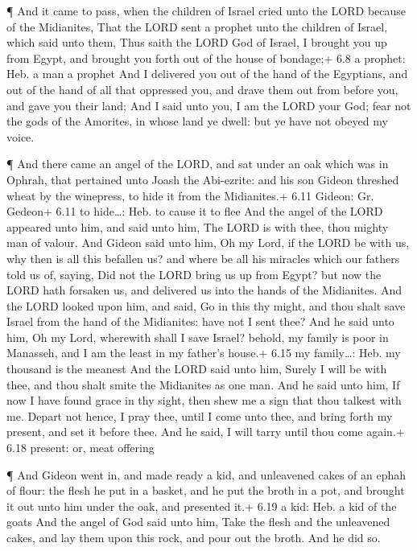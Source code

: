  ¶ And it came to pass, when the children of Israel cried
unto the LORD because of the Midianites,  That the LORD sent
a prophet unto the children of Israel, which said unto them, Thus saith
the LORD God of Israel, I brought you up from Egypt, and brought you
forth out of the house of bondage;+ 6.8 a prophet: Heb. a man a prophet
 And I delivered you out of the hand of the Egyptians, and
out of the hand of all that oppressed you, and drave them out from
before you, and gave you their land;  And I said unto you,
I am the LORD your God; fear not the gods of the Amorites, in whose land
ye dwell: but ye have not obeyed my voice.

 ¶ And there came an angel of the LORD, and sat under an
oak which was in Ophrah, that pertained unto Joash the Abi-ezrite: and
his son Gideon threshed wheat by the winepress, to hide it from the
Midianites.+ 6.11 Gideon: Gr. Gedeon+ 6.11 to hide\ldots: Heb. to cause
it to flee  And the angel of the LORD appeared unto him,
and said unto him, The LORD is with thee, thou mighty man of valour.
 And Gideon said unto him, Oh my Lord, if the LORD be with
us, why then is all this befallen us? and where be all his miracles
which our fathers told us of, saying, Did not the LORD bring us up from
Egypt? but now the LORD hath forsaken us, and delivered us into the
hands of the Midianites.  And the LORD looked upon him, and
said, Go in this thy might, and thou shalt save Israel from the hand of
the Midianites: have not I sent thee?  And he said unto
him, Oh my Lord, wherewith shall I save Israel? behold, my family is
poor in Manasseh, and I am the least in my father's house.+ 6.15 my
family\ldots: Heb. my thousand is the meanest  And the LORD
said unto him, Surely I will be with thee, and thou shalt smite the
Midianites as one man.  And he said unto him, If now I have
found grace in thy sight, then shew me a sign that thou talkest with me.
 Depart not hence, I pray thee, until I come unto thee, and
bring forth my present, and set it before thee. And he said, I will
tarry until thou come again.+ 6.18 present: or, meat offering

 ¶ And Gideon went in, and made ready a kid, and unleavened
cakes of an ephah of flour: the flesh he put in a basket, and he put the
broth in a pot, and brought it out unto him under the oak, and presented
it.+ 6.19 a kid: Heb. a kid of the goats  And the angel of
God said unto him, Take the flesh and the unleavened cakes, and lay them
upon this rock, and pour out the broth. And he did so.

